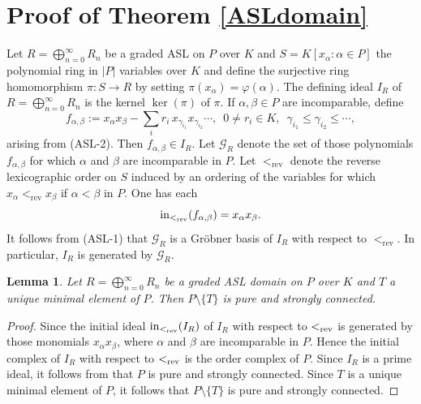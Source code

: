 \documentclass[12pt]{amsart}
\def\Gc{{\mathcal G}}
\def\Gc{{\mathcal G}}
\let\to=\rightarrow
\newtheorem{Lemma}[Theorem]{Lemma}
\begin{document}
\section{Proof of Theorem \ref{ASLdomain}}

Let $R = \bigoplus_{n=0}^{\infty} R_n$ be a graded ASL on $P$ over $K$ and $S=K[x_{\alpha} : \alpha \in P]$ the polynomial ring in $|P|$ variables over $K$ and define the surjective ring homomorphism $\pi: S \to R$ by setting $\pi(x_\alpha) = \varphi(\alpha)$. The defining ideal $I_R$ of $R=\bigoplus_{n=0}^{\infty} R_n$ is the kernel $\ker(\pi)$ of $\pi$. If $\alpha,\beta \in P$ are incomparable, define
\[
f_{\alpha,\beta}
:= x_\alpha x_\beta - \sum_{i} r_i\,x_{\gamma_{i_1}} x_{\gamma_{i_2}}\cdots , \, \, \, 0 \neq r_i \in K, \, \, \, \gamma_{i_1}\leq \gamma_{i_2}\leq \cdots,
\]
arising from (ASL-2). Then $f_{\alpha,\beta} \in I_R$. Let $\Gc_R$ denote the set of those polynomials $f_{\alpha,\beta}$ for which  $\alpha$ and $\beta$ are incomparable in $P$. Let $<_{\mathrm{rev}}$ denote the reverse lexicographic order \cite[Example~2.1.2(b)]{HHgtm260} on $S$ induced by an ordering of the variables for which $x_{\alpha} <_{\mathrm{rev}} x_{\beta}$ if $\alpha < \beta$ in $P$.  One has each 
\[
{\rm in}_{<_{\mathrm{rev}}}(f_{\alpha, \beta}) = x_\alpha x_\beta.
\]
It follows from (ASL-1) that $\Gc_R$ is a Gröbner basis of $I_R$ with respect to $<_{\mathrm{rev}}$.  In particular, $I_R$ is generated by $\Gc_R$.

\begin{Lemma}
\label{KS}
    Let $R = \bigoplus_{n=0}^{\infty} R_n$ be a graded ASL domain on $P$ over $K$ and $T$ a unique minimal element of $P$.  Then $P\setminus \{T\}$ is pure and strongly connected.
\end{Lemma}

\begin{proof}
    Since the initial ideal ${\rm in}_{<_{\rm rev}}(I_R)$ of $I_R$ with respect to $<_{\rm rev}$ is generated by those monomials $x_\alpha x_\beta$, where $\alpha$ and $\beta$ are incomparable in $P$.  Hence the initial complex \cite[p.~366]{KS} of $I_R$ with respect to $<_{\rm rev}$ is the order complex \cite[p.~119]{HIBIred} of $P$.  Since $I_R$ is a prime ideal, it follows from \cite[Theorem 1]{KS} that $P$ is pure and strongly connected.  Since $T$ is a unique minimal element of $P$, it follows that $P \setminus \{T\}$ is pure and strongly connected.
    \hspace{9.3cm}
\end{proof}
\end{document}
